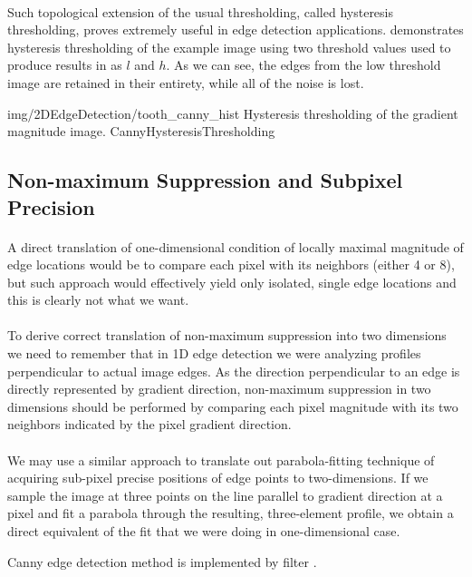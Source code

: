 \paragraph*{}
Such topological extension of the usual thresholding, called hysteresis thresholding, proves extremely useful in edge detection applications.  demonstrates hysteresis thresholding of the example image using two threshold values used to produce results in  as $l$ and $h$. As we can see, the edges from the low threshold image are retained in their entirety, while all of the noise is lost.

\oneFigure
{img/2DEdgeDetection/tooth_canny_hist}
{Hysteresis thresholding of the gradient magnitude image.}
{CannyHysteresisThresholding}
{\basicWidth}

\subsection{Non-maximum Suppression and Subpixel Precision}

\paragraph*{}
A direct translation of one-dimensional condition of locally maximal magnitude of edge locations would be to compare each pixel with its neighbors (either 4 or 8), but such approach would effectively yield only isolated, single edge locations and this is clearly not what we want.

\paragraph*{}
To derive correct translation of non-maximum suppression into two dimensions we need to remember that in 1D edge detection we were analyzing profiles perpendicular to actual image edges. As the direction perpendicular to an edge is directly represented by gradient direction, non-maximum suppression in two dimensions should be performed by comparing each pixel magnitude with its two neighbors indicated by the pixel gradient direction.

\paragraph*{}
We may use a similar approach to translate out parabola-fitting technique of acquiring sub-pixel precise positions of edge points to two-dimensions. If we sample the image at three points on the line parallel to gradient direction at a pixel and fit a parabola through the resulting, three-element profile, we obtain a direct equivalent of the fit that we were doing in one-dimensional case.

\begin{refImpl}
Canny edge detection method is implemented by \studio filter .
\end{refImpl}